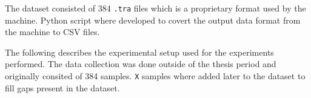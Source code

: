 The dataset consisted of 384 \texttt{.tra} files which is a proprietary format used by
the machine.
Python script where developed to covert the output data format from the
machine to CSV files.

The following describes the experimental setup used for the experiments
performed.
The data collection was done outside of the thesis period and originally consited of 384
samples. \texttt{X} samples where added later to the dataset to fill gaps present in
the dataset.


%
%
%
%
